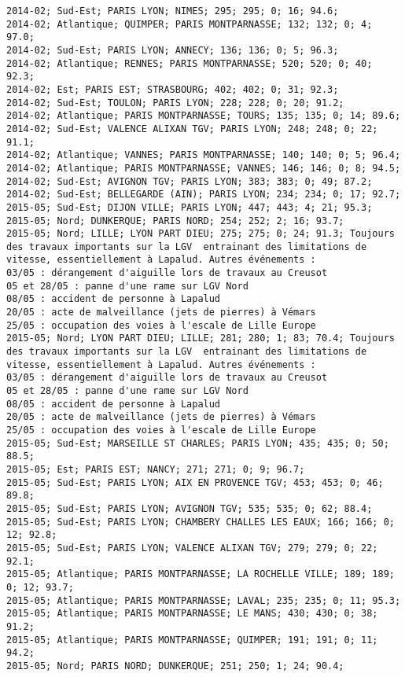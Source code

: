 \documentclass{article}
\begin{document}
\begin{Verbatim}[commandchars=\\\{\}]
2014-02; Sud-Est; PARIS LYON; NIMES; 295; 295; 0; 16; 94.6; 
2014-02; Atlantique; QUIMPER; PARIS MONTPARNASSE; 132; 132; 0; 4; 97.0; 
2014-02; Sud-Est; PARIS LYON; ANNECY; 136; 136; 0; 5; 96.3; 
2014-02; Atlantique; RENNES; PARIS MONTPARNASSE; 520; 520; 0; 40; 92.3; 
2014-02; Est; PARIS EST; STRASBOURG; 402; 402; 0; 31; 92.3; 
2014-02; Sud-Est; TOULON; PARIS LYON; 228; 228; 0; 20; 91.2; 
2014-02; Atlantique; PARIS MONTPARNASSE; TOURS; 135; 135; 0; 14; 89.6; 
2014-02; Sud-Est; VALENCE ALIXAN TGV; PARIS LYON; 248; 248; 0; 22; 91.1; 
2014-02; Atlantique; VANNES; PARIS MONTPARNASSE; 140; 140; 0; 5; 96.4; 
2014-02; Atlantique; PARIS MONTPARNASSE; VANNES; 146; 146; 0; 8; 94.5; 
2014-02; Sud-Est; AVIGNON TGV; PARIS LYON; 383; 383; 0; 49; 87.2; 
2014-02; Sud-Est; BELLEGARDE (AIN); PARIS LYON; 234; 234; 0; 17; 92.7; 
2015-05; Sud-Est; DIJON VILLE; PARIS LYON; 447; 443; 4; 21; 95.3; 
2015-05; Nord; DUNKERQUE; PARIS NORD; 254; 252; 2; 16; 93.7; 
2015-05; Nord; LILLE; LYON PART DIEU; 275; 275; 0; 24; 91.3; Toujours des travaux importants sur la LGV  entrainant des limitations de vitesse, essentiellement à Lapalud. Autres événements :
03/05 : dérangement d'aiguille lors de travaux au Creusot
05 et 28/05 : panne d'une rame sur LGV Nord
08/05 : accident de personne à Lapalud
20/05 : acte de malveillance (jets de pierres) à Vémars
25/05 : occupation des voies à l'escale de Lille Europe
2015-05; Nord; LYON PART DIEU; LILLE; 281; 280; 1; 83; 70.4; Toujours des travaux importants sur la LGV  entrainant des limitations de vitesse, essentiellement à Lapalud. Autres événements :
03/05 : dérangement d'aiguille lors de travaux au Creusot
05 et 28/05 : panne d'une rame sur LGV Nord
08/05 : accident de personne à Lapalud
20/05 : acte de malveillance (jets de pierres) à Vémars
25/05 : occupation des voies à l'escale de Lille Europe
2015-05; Sud-Est; MARSEILLE ST CHARLES; PARIS LYON; 435; 435; 0; 50; 88.5; 
2015-05; Est; PARIS EST; NANCY; 271; 271; 0; 9; 96.7; 
2015-05; Sud-Est; PARIS LYON; AIX EN PROVENCE TGV; 453; 453; 0; 46; 89.8; 
2015-05; Sud-Est; PARIS LYON; AVIGNON TGV; 535; 535; 0; 62; 88.4; 
2015-05; Sud-Est; PARIS LYON; CHAMBERY CHALLES LES EAUX; 166; 166; 0; 12; 92.8; 
2015-05; Sud-Est; PARIS LYON; VALENCE ALIXAN TGV; 279; 279; 0; 22; 92.1; 
2015-05; Atlantique; PARIS MONTPARNASSE; LA ROCHELLE VILLE; 189; 189; 0; 12; 93.7; 
2015-05; Atlantique; PARIS MONTPARNASSE; LAVAL; 235; 235; 0; 11; 95.3; 
2015-05; Atlantique; PARIS MONTPARNASSE; LE MANS; 430; 430; 0; 38; 91.2; 
2015-05; Atlantique; PARIS MONTPARNASSE; QUIMPER; 191; 191; 0; 11; 94.2; 
2015-05; Nord; PARIS NORD; DUNKERQUE; 251; 250; 1; 24; 90.4; 

\end{Verbatim}
\end{document}
